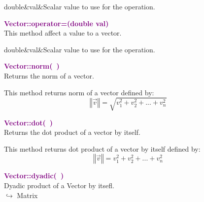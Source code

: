 \begin{tcolorbox}[width=\textwidth,myArgs,tabularx={ll|R}]
double&val&Scalar value to use for the  operation.
\end{tcolorbox}


\textcolor{purple}{\textbf{Vector::operator=(double val)}}\label{Vector::operator=(double val)}\\
This method affect a value to a vector.

\begin{tcolorbox}[width=\textwidth,myArgs,tabularx={ll|R}]
double&val&Scalar value to use for the  operation.
\end{tcolorbox}


\textcolor{purple}{\textbf{Vector::norm(~)}}\label{Vector::norm()}\\
Returns the norm of a vector.

This method returns norm of a vector defined by:
\begin{equation*}
\left\Vert \overrightarrow{v} \right\Vert = \sqrt {v_{1}^2 + v_{2}^2 + ... + v_{n}^2}
\end{equation*}

\textcolor{purple}{\textbf{Vector::dot(~)}}\label{Vector::dot()}\\
Returns the dot product of a vector by itself.

This method returns dot product of a vector by itself defined by:
\begin{equation*}
 \left\Vert \overrightarrow{v} \right\Vert  = v_{1}^2 + v_{2}^2 + ... + v_{n}^2
\end{equation*}

\textcolor{purple}{\textbf{Vector::dyadic(~)}}\label{Vector::dyadic()}\\
Dyadic product of a Vector by itsefl.\\ \hspace*{10mm}$\hookrightarrow$ Matrix

